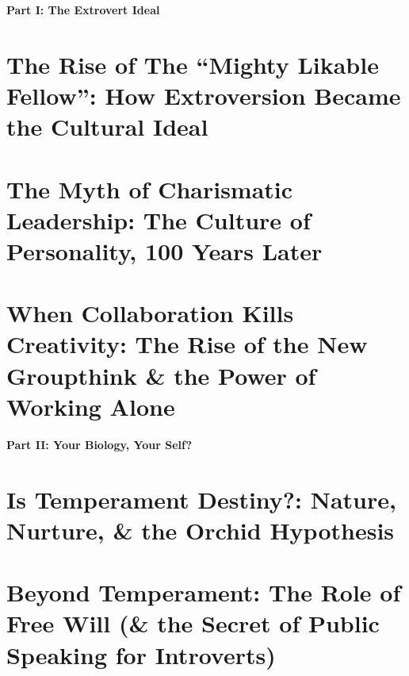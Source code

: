\documentclass{article}
\numberwithin{equation}{section}
\begin{document}

\begin{center}\LARGE\sf
	\textbf{Part I: The Extrovert Ideal}
\end{center}

\section{The Rise of The ``Mighty Likable Fellow'': How Extroversion Became the Cultural Ideal}


\section{The Myth of Charismatic Leadership: The Culture of Personality, 100 Years Later}


\section{When Collaboration Kills Creativity: The Rise of the New Groupthink \& the Power of Working Alone}


\begin{center}\LARGE\sf
	\textbf{Part II: Your Biology, Your Self?}
\end{center}

\section{Is Temperament Destiny?: Nature, Nurture, \& the Orchid Hypothesis}


\section{Beyond Temperament: The Role of Free Will (\& the Secret of Public Speaking for Introverts)}

\end{document}
